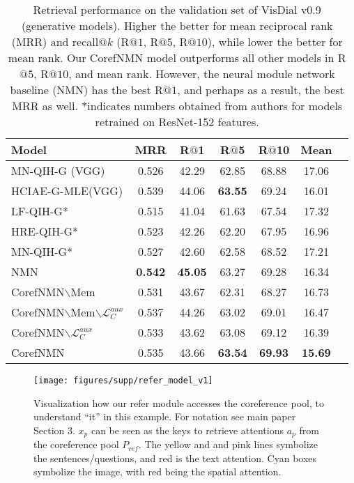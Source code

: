 \documentclass[runningheads]{llncs}
\makeatletter
\def\adl@drawiv#1#2#3{\hskip.5\tabcolsep
        \xleaders#3{#2.5\@tempdimb #1{1}#2.5\@tempdimb}#2\z@ plus1fil minus1fil\relax
        \hskip.5\tabcolsep}
\newcommand{\cdashlinelr}[1]{\noalign{\vskip\aboverulesep
           \global\let\@dashdrawstore\adl@draw
           \global\let\adl@draw\adl@drawiv}
  \cdashline{#1}
  \noalign{\global\let\adl@draw\@dashdrawstore
           \vskip\belowrulesep}}
\newcommand{\nmn}{CorefNMN\xspace}
\newcommand{\addresults}[1]{}
\makeatother
\begin{document}
\begin{table}[t]
	\centering
	\setlength{\tabcolsep}{6pt}
\begin{tabular}{lcccccc}
	\toprule
	\textbf{Model} & \textbf{MRR} & \textbf{R$@$1} & \textbf{R$@$5}
    				& \textbf{R$@$10} & \textbf{Mean} \\\midrule
	MN-QIH-G \cite{visdial} (VGG) & 0.526 & 42.29 & 62.85 & 68.88 & 17.06 \\
    HCIAE-G-MLE\cite{lu_nips16}(VGG) & 0.539 & 44.06 & \textbf{63.55} & 69.24 & 16.01\\
\cdashlinelr{1-6}
LF-QIH-G* \cite{visdial} & 0.515 & 41.04 & 61.63 & 67.54 & 17.32\\
    HRE-QIH-G* \cite{visdial} & 0.523 & 42.26 & 62.20 & 67.95 & 16.96\\
    MN-QIH-G* \cite{visdial} & 0.527 & 42.60 & 62.58 & 68.52 & 17.21\\
    NMN\cite{hu2017learning} & \textbf{0.542} & \textbf{45.05} & 63.27 & 69.28 & 16.34\\
	\cdashlinelr{1-6}
    \nmn{}$\backslash$Mem & 0.531 & 43.67 & 62.31 & 68.27 & 16.73 \\
    \nmn{}$\backslash$Mem$\backslash\mathcal{L}_C^{aux}$ 
				& 0.537 & 44.26 & 63.02 & 69.01 & 16.47 \\
	\nmn{}$\backslash\mathcal{L}_C^{aux}$ &
    			0.533 & 43.62 & 63.08 & 69.12 & 16.39 \\
    \nmn & 0.535 & 43.66 & \textbf{63.54} & \textbf{69.93} & \textbf{15.69}\\
    \bottomrule
	\end{tabular}
\caption{
    Retrieval performance on the validation set of VisDial v0.9 
    \cite{visdial} (generative models).
    Higher the better for mean reciprocal rank (MRR) and recall$@k$ 
    (R$@1$, R$@5$, R$@10$), while lower the better for mean rank.
    Our \nmn model outperforms all other models in R$@5$, R$@10$, and mean rank.
    However, the neural module network baseline (NMN) has the best R$@1$, and 
    perhaps as a result, the best MRR as well.
    *indicates numbers obtained from authors for models retrained on 
    ResNet-152 features. \addresults{The right most column shows grounding performance (higher is better)}}
    \label{tab:visdial_result_table}
\end{table} 
\begin{figure}[t]
	\centering
    \texttt{[image: figures/supp/refer\_model\_v1]}
	\caption{Visualization how our refer module accesses the coreference pool, to understand ``it'' in this example. For notation see main paper Section 3. $x_p$ can be seen as the keys to retrieve attentions $a_p$ from the coreference pool $P_{ref}$. The yellow and and pink lines symbolize the sentences/questions, and red is the text attention. Cyan boxes symbolize the image, with red being the spatial attention.}
    \label{fig:refer_visual}
\end{figure}
\end{document}
